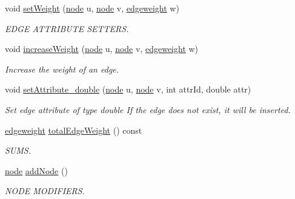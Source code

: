 \begin{DoxyCompactItemize}
\item 
void \hyperlink{class_networ_kit_1_1_graph_ad56d4fada3895f8446e58d7cd33ca274}{set\-Weight} (\hyperlink{namespace_networ_kit_a53fe3e4fd04ea024160e4d024dfebadf}{node} u, \hyperlink{namespace_networ_kit_a53fe3e4fd04ea024160e4d024dfebadf}{node} v, \hyperlink{namespace_networ_kit_a831b108dbcd79dad062d9e28b1b4e3dd}{edgeweight} w)
\begin{DoxyCompactList}\small\item\em E\-D\-G\-E A\-T\-T\-R\-I\-B\-U\-T\-E S\-E\-T\-T\-E\-R\-S. \end{DoxyCompactList}\item 
void \hyperlink{class_networ_kit_1_1_graph_ae797c43b2cb8a8c32b7e36b18a4f4e04}{increase\-Weight} (\hyperlink{namespace_networ_kit_a53fe3e4fd04ea024160e4d024dfebadf}{node} u, \hyperlink{namespace_networ_kit_a53fe3e4fd04ea024160e4d024dfebadf}{node} v, \hyperlink{namespace_networ_kit_a831b108dbcd79dad062d9e28b1b4e3dd}{edgeweight} w)
\begin{DoxyCompactList}\small\item\em Increase the weight of an edge. \end{DoxyCompactList}\item 
void \hyperlink{class_networ_kit_1_1_graph_a05e6af930ba5b3ca6b74d1e3b2cffd0e}{set\-Attribute\-\_\-double} (\hyperlink{namespace_networ_kit_a53fe3e4fd04ea024160e4d024dfebadf}{node} u, \hyperlink{namespace_networ_kit_a53fe3e4fd04ea024160e4d024dfebadf}{node} v, int attr\-Id, double attr)
\begin{DoxyCompactList}\small\item\em Set edge attribute of type double If the edge does not exist, it will be inserted. \end{DoxyCompactList}\item 
\hyperlink{namespace_networ_kit_a831b108dbcd79dad062d9e28b1b4e3dd}{edgeweight} \hyperlink{class_networ_kit_1_1_graph_af551ff2797df147e30eeccbada64fd90}{total\-Edge\-Weight} () const 
\begin{DoxyCompactList}\small\item\em S\-U\-M\-S. \end{DoxyCompactList}\item 
\hyperlink{namespace_networ_kit_a53fe3e4fd04ea024160e4d024dfebadf}{node} \hyperlink{class_networ_kit_1_1_graph_a6f6d56aae8ee494223164a54d30d4ea6}{add\-Node} ()
\begin{DoxyCompactList}\small\item\em N\-O\-D\-E M\-O\-D\-I\-F\-I\-E\-R\-S. \end{DoxyCompactList}\item 

\end{DoxyCompactItemize}
